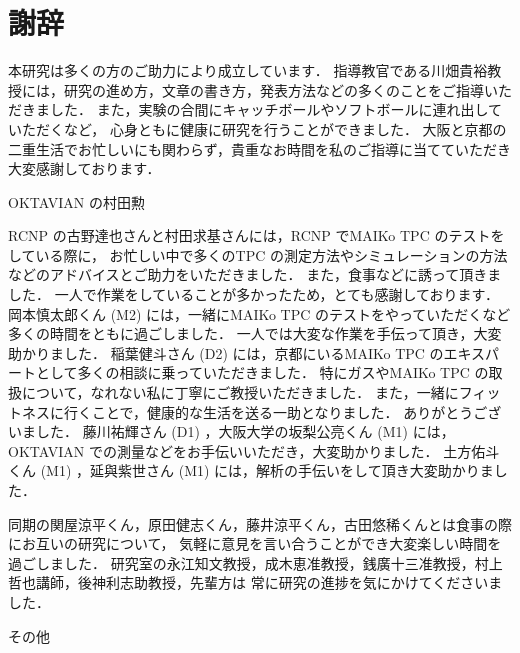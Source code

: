\documentclass[../master]{subfiles}
\begin{document}
\chapter*{謝辞}
本研究は多くの方のご助力により成立しています．
指導教官である川畑貴裕教授には，研究の進め方，文章の書き方，発表方法などの多くのことをご指導いただきました．
また，実験の合間にキャッチボールやソフトボールに連れ出していただくなど，
心身ともに健康に研究を行うことができました．
大阪と京都の二重生活でお忙しいにも関わらず，貴重なお時間を私のご指導に当てていただき大変感謝しております．

OKTAVIAN の村田勲

RCNP の古野達也さんと村田求基さんには，RCNP でMAIKo TPC のテストをしている際に，
お忙しい中で多くのTPC の測定方法やシミュレーションの方法などのアドバイスとご助力をいただきました．
また，食事などに誘って頂きました．
一人で作業をしていることが多かったため，とても感謝しております．
岡本慎太郎くん (M2) には，一緒にMAIKo TPC のテストをやっていただくなど多くの時間をともに過ごしました．
一人では大変な作業を手伝って頂き，大変助かりました．
稲葉健斗さん (D2) には，京都にいるMAIKo TPC のエキスパートとして多くの相談に乗っていただきました．
特にガスやMAIKo TPC の取扱について，なれない私に丁寧にご教授いただきました．
また，一緒にフィットネスに行くことで，健康的な生活を送る一助となりました．
ありがとうございました．
藤川祐輝さん (D1) ，大阪大学の坂梨公亮くん (M1) には，OKTAVIAN での測量などをお手伝いいただき，大変助かりました．
土方佑斗くん (M1) ，延與紫世さん (M1) には，解析の手伝いをして頂き大変助かりました．

同期の関屋涼平くん，原田健志くん，藤井涼平くん，古田悠稀くんとは食事の際にお互いの研究について，
気軽に意見を言い合うことができ大変楽しい時間を過ごしました．
研究室の永江知文教授，成木恵准教授，銭廣十三准教授，村上哲也講師，後神利志助教授，先輩方は
常に研究の進捗を気にかけてくださいました．

その他
\end{document}
